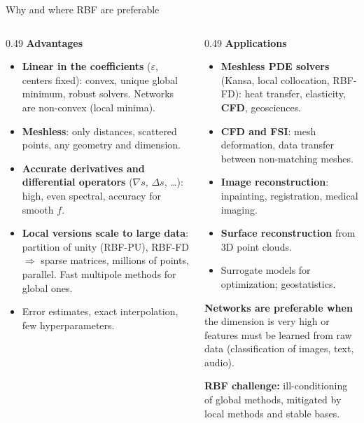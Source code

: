 \documentclass[10pt,aspectratio=169]{beamer}
\newcommand{\hl}[1]{\textcolor{accent}{\textbf{#1}}}
\begin{document}
\begin{frame}{Why and where RBF are preferable}
  \footnotesize
  \begin{columns}[T]
    \begin{column}{0.49\textwidth}
      \textbf{Advantages}
      \begin{itemize}
        \item \hl{Linear in the coefficients} ($\varepsilon$, centers fixed):
              convex, unique global minimum, robust solvers. Networks are
              non-convex (local minima).
        \item \hl{Meshless}: only distances, scattered points, any geometry
              and dimension.
        \item \hl{Accurate derivatives and differential operators}
              ($\nabla s$, $\Delta s$, \dots): high, even spectral, accuracy
              for smooth $f$.
        \item \hl{Local versions scale to large data}: partition of unity
              (RBF-PU), RBF-FD $\Rightarrow$ sparse matrices, millions of
              points, parallel. Fast multipole methods for global ones.
        \item Error estimates, exact interpolation, few hyperparameters.
      \end{itemize}
    \end{column}
    \begin{column}{0.49\textwidth}
      \textbf{Applications}
      \begin{itemize}
        \item \hl{Meshless PDE solvers} (Kansa, local collocation, RBF-FD):
              heat transfer, elasticity, \hl{CFD}, geosciences.
        \item \hl{CFD and FSI}: mesh deformation, data transfer between
              non-matching meshes.
        \item \hl{Image reconstruction}: inpainting, registration, medical
              imaging.
        \item \hl{Surface reconstruction} from 3D point clouds.
        \item Surrogate models for optimization; geostatistics.
      \end{itemize}
      \vspace{0.3em}
      \textbf{Networks are preferable when} the dimension is very high or
      features must be learned from raw data (classification of images,
      text, audio).
      \vspace{0.2em}

      \textbf{RBF challenge:} ill-conditioning of global methods, mitigated
      by local methods and stable bases.
    \end{column}
  \end{columns}
\end{frame}
\end{document}
